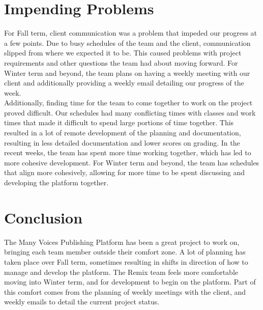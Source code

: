\documentclass[onecolumn, draftclsnofoot,10pt, compsoc]{IEEEtran}
\begin{document}
\section{Impending Problems}

For Fall term, client communication was a problem that impeded our progress at a few points.
Due to busy schedules of the team and the client, communication slipped from where we expected it to be.
This caused problems with project requirements and other questions the team had about moving forward.
For Winter term and beyond, the team plans on having a weekly meeting with our client and additionally providing a weekly email detailing our progress of the week. \\ 

\noindent Additionally, finding time for the team to come together to work on the project proved difficult.
Our schedules had many conflicting times with classes and work times that made it difficult to spend large portions of time together.
This resulted in a lot of remote development of the planning and documentation, resulting in less detailed documentation and lower scores on grading.
In the recent weeks, the team has spent more time working together, which has led to more cohesive development.
For Winter term and beyond, the team has schedules that align more cohesively, allowing for more time to be spent discussing and developing the platform together.

\section{Conclusion}

The Many Voices Publishing Platform has been a great project to work on, bringing each team member outside their comfort zone. A lot of planning has taken place over Fall term, sometimes resulting in shifts in direction of how to manage and develop the platform. The Remix team feels more comfortable moving into Winter term, and for development to begin on the platform. Part of this comfort comes from the planning of weekly meetings with the client, and weekly emails to detail the current project status.
\end{document}
